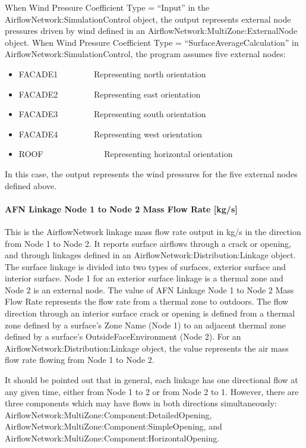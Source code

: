 When Wind Pressure Coefficient Type = ``Input'' in the AirflowNetwork:SimulationControl object, the output represents external node pressures driven by wind defined in an AirflowNetwork:MultiZone:ExternalNode object. When Wind Pressure Coefficient Type = ``SurfaceAverageCalculation'' in AirflowNetwork:SimulationControl, the program assumes five external nodes:

\begin{itemize}
\item
  FACADE1~~~~~~~~ Representing north orientation
\item
  FACADE2~~~~~~~~ Representing east orientation
\item
  FACADE3~~~~~~~~ Representing south orientation
\item
  FACADE4~~~~~~~~ Representing west orientation
\item
  ROOF~~~~~~~~~~~~~~ Representing horizontal orientation
\end{itemize}

In this case, the output represents the wind pressures for the five external nodes defined above.

\paragraph{AFN Linkage Node 1 to Node 2 Mass Flow Rate {[}kg/s{]}}\label{afn-linkage-node-1-to-node-2-mass-flow-rate-kgs}

This is the AirflowNetwork linkage mass flow rate output in kg/s in the direction from Node 1 to Node 2. It reports surface airflows through a crack or opening, and through linkages defined in an AirflowNetwork:Distribution:Linkage object. The surface linkage is divided into two types of surfaces, exterior surface and interior surface. Node 1 for an exterior surface linkage is a thermal zone and Node 2 is an external node. The value of AFN Linkage Node 1 to Node 2 Mass Flow Rate represents the flow rate from a thermal zone to outdoors. The flow direction through an interior surface crack or opening is defined from a thermal zone defined by a surface's Zone Name (Node 1) to an adjacent thermal zone defined by a surface's OutsideFaceEnvironment (Node 2). For an AirflowNetwork:Distribution:Linkage object, the value represents the air mass flow rate flowing from Node 1 to Node 2.

It should be pointed out that in general, each linkage has one directional flow at any given time, either from Node 1 to 2 or from Node 2 to 1. However, there are three components which may have flows in both directions simultaneously: AirflowNetwork:MultiZone:Component:DetailedOpening, AirflowNetwork:MultiZone:Component:SimpleOpening, and AirflowNetwork:MultiZone:Component:HorizontalOpening.

